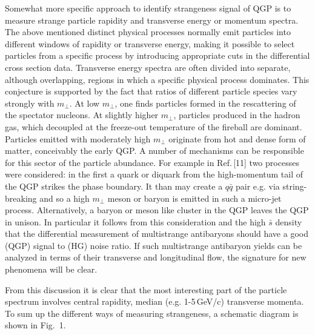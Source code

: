 \begin{mdframed}[linecolor=gray,roundcorner=12pt,backgroundcolor=Dandelion!15,linewidth=1pt,leftmargin=0cm,rightmargin=0cm,topline=true,bottomline=true,skipabove=12pt]
Somewhat more specific approach to identify strangeness signal of QGP is to measure strange particle rapidity and transverse energy or momentum spectra. The above mentioned distinct physical processes normally emit particles into different windows of rapidity or transverse energy, making it possible to select particles from a specific process by introducing appropriate cuts in the differential cross section data. Transverse energy spectra are often divided into separate, although overlapping, regions in which a specific physical process dominates\footnotemark[9]. This conjecture is supported by the fact that ratios of different particle species vary strongly with $m_\perp$. At low $m_\perp$, one finds particles formed in the rescattering of the spectator nucleons. At slightly higher $m_\perp$, particles produced in the hadron gas, which decoupled at the freeze-out temperature of the fireball are dominant. Particles emitted with moderately high $m_\perp$ originate from hot and dense form of matter, conceivably the early QGP. A number of mechanisms can be responsible for this sector of the particle abundance. For example in Ref.\,[11] two processes were considered: in the first a quark or diquark from the high-momentum tail of the QGP strikes the phase boundary. It than may create a $q\bar q$ pair e.g. via string-breaking and so a high $m_\perp$ meson or baryon is emitted in such a micro-jet process. Alternatively, a baryon or meson like cluster in the QGP leaves the QGP in unison. In particular it follows from this consideration and the high $\bar s$ density that the differential measurement of multistrange antibaryons should have a good (QGP) signal to (HG) noise ratio. If such multistrange antibaryon yields can be analyzed in terms of their transverse and longitudinal flow, the signature for new phenomena will be clear.  

From this discussion it is clear that the most interesting part of the particle spectrum involves central rapidity, median (e.g. 1-5\,GeV/c) transverse momenta. To sum up the different ways of measuring strangeness, a schematic diagram is shown in Fig.~1.\\


\end{mdframed}
